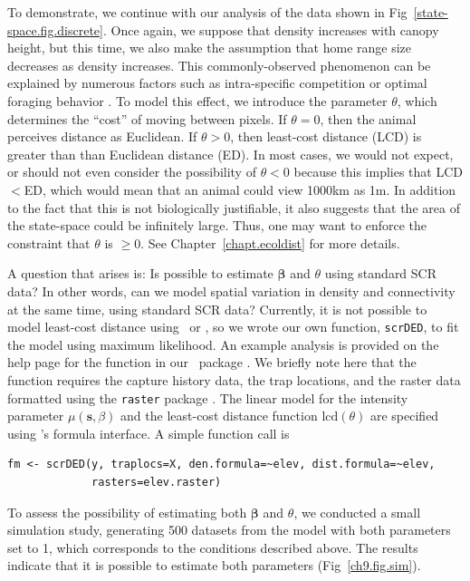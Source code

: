 To demonstrate, we continue with our analysis of the data shown in
Fig~\ref{state-space.fig.discrete}. Once again, we suppose that density
increases with canopy height, but this time, we also make the
assumption that home range size decreases as density increases. This
commonly-observed phenomenon can be explained by numerous factors such
as intra-specific competition \citep{sillett_etal:2004} or optimal
foraging behavior \citep{tufto_etal:1996,said_servanty:2005}. To model
this effect, we
introduce the parameter $\theta$, which determines the ``cost'' of
moving between pixels. If $\theta=0$, then the animal perceives
distance as Euclidean. If $\theta>0$, then least-cost distance (LCD)
is greater than than Euclidean distance (ED). In most cases, we would
not expect,
or should not even consider the possibility of $\theta<0$ because this
implies that LCD$<$ED, which would mean that an animal could view
1000km as 1m. In addition to the fact that this is not biologically
justifiable, it also suggests that the area of the state-space could
be infinitely large. Thus, one may want to enforce the constraint that
$\theta$ is $\geq 0$. See Chapter~\ref{chapt.ecoldist} for
more details.

A question that arises is: Is possible to estimate $\bm \beta$
and $\theta$ using standard SCR data? In other words, can we model
spatial variation in density and connectivity at the same time,
using standard SCR data? Currently, it is not possible to
model least-cost distance using \jags~or \secr, so we wrote our own
function, \verb+scrDED+, to fit the model using maximum likelihood. An
example analysis is provided on the help page for the function in our
\R~package \scrbook. We briefly note here that the function requires
the capture history data, the trap locations, and the raster data
formatted using the {\tt raster} package
\citep{hijmans_vanetten:2012}. The linear model for the
intensity parameter $\mu(\mathbf{s}, \beta)$ and the least-cost distance
function $\text{lcd}(\theta)$ are specified using \R's formula interface. A
simple function call is
\begin{verbatim}
fm <- scrDED(y, traplocs=X, den.formula=~elev, dist.formula=~elev,
             rasters=elev.raster)
\end{verbatim}
To assess the possibility of estimating both $\bm \beta$ and $\theta$, we
conducted a small simulation study, generating 500 datasets from the
model with both parameters set to 1, which corresponds to the
conditions described above. The results indicate that it is
possible to estimate both parameters
(Fig~\ref{ch9.fig.sim}).

